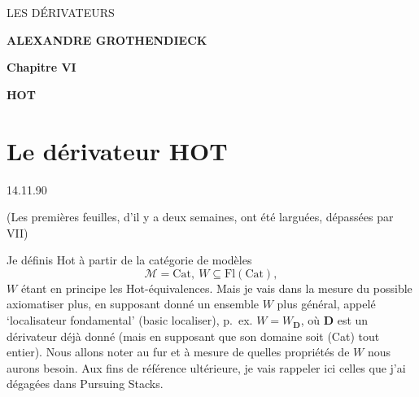 \documentclass[11pt]{article}
\newcommand{\printedpage}[1]{\marginpar{\footnotesize p.~#1}}
\newcommand{\msp}[1]{\marginpar{\footnotesize [#1]}}
\begin{document}
\begin{center}
\printedpage{[sans numéro]}%

\vspace*{6cm}

{\Large\textsf{LES DÉRIVATEURS}}

\bigskip

\textbf{ALEXANDRE GROTHENDIECK}

\vspace{2cm}

\textbf{Chapitre VI}

\medskip

\textbf{HOT}
\end{center}

\clearpage

\vspace*{6cm}


\clearpage

\noindent\printedpage{1}
\msp{page 1}

\section*{\normalsize Le dérivateur \textmd{HOT}}

\begin{flushright}
14.11.90
\end{flushright}

\begin{flushright}
(Les premières feuilles, d'il y a deux semaines, ont été larguées, dépassées par VII)
\end{flushright}

\noindent Je définis Hot à partir de la catégorie de modèles
\[
\mathcal{M} = \mathrm{Cat},\ W \subseteq \mathrm{Fl}(\mathrm{Cat}),
\]
$W$ étant en principe les Hot-équivalences. Mais je vais dans la mesure du possible axiomatiser plus, en supposant donné un ensemble $W$ plus général, appelé `localisateur fondamental' (basic localiser), p.~ex. $W = W_{\mathbf{D}}$, où $\mathbf{D}$ est un dérivateur déjà donné (mais en supposant que son domaine soit (Cat) tout entier). Nous allons noter au fur et à mesure de quelles propriétés de $W$ nous aurons besoin. Aux fins de référence ultérieure, je vais rappeler ici celles que j'ai dégagées dans Pursuing Stacks.
\end{document}
